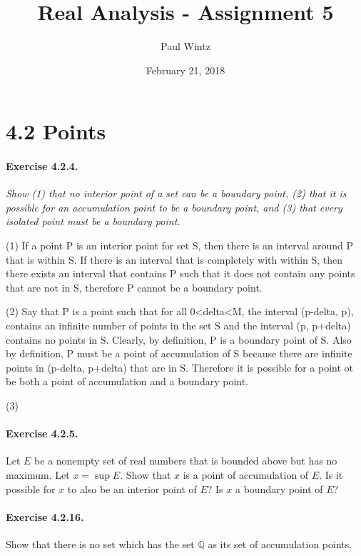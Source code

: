\documentclass[11pt]{article}
\title{Real Analysis - Assignment 5}
\author{Paul Wintz}
\date{February 21, 2018}
\begin{document}
\maketitle


\section*{4.2 Points}
\paragraph{Exercise 4.2.4.} \textit{Show (1) that no interior point of a set can be a boundary point, (2) that it is possible for an accumulation point to be a boundary point, and (3) that every isolated point must be a boundary point.} \newline

(1) If a point P is an interior point for set S, then there is an interval around P that is within S. If there is an interval that is completely with within S, then there exists an interval that contains P such that it does not contain any points that are not in S, therefore P cannot be a boundary point. %

(2) Say that P is a point such that for all 0<delta<M, the interval (p-delta, p), contains an infinite number of points in the set S and the interval (p, p+delta) contains no points in S. Clearly, by definition, P is a boundary point of S. Also by definition, P must be a point of accumulation of S because there are infinite points in (p-delta, p+delta) that are in S. Therefore it is possible for a point ot be both a point of accumulation and a boundary point.

(3) 

\paragraph{Exercise 4.2.5.} Let $E$ be a nonempty set of real numbers that is bounded above but has no maximum.
Let $x = \sup E$.
Show that $x$ is a point of accumulation of $E$.
Is it possible for $x$ to also be an interior point of $E$?
Is $x$ a boundary point of $E$?

\paragraph{Exercise 4.2.16.} Show that there is no set which has the set $\mathbb{Q}$ as its set of accumulation points.
\end{document}
